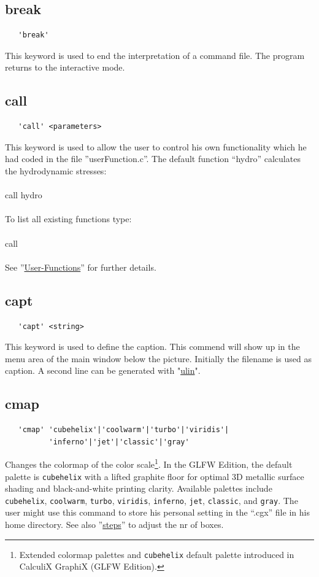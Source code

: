 \documentclass{article}
\providecommand{\htmlref}[2]{\hyperref[#2]{#1}}
\begin{document}
\subsection{\label{break}break}
\begin{verbatim}
   'break'
\end{verbatim}
This keyword is used to end the interpretation of a command file. The program returns to the interactive mode.

\subsection{\label{call}call}
\begin{verbatim}
   'call' <parameters>
\end{verbatim}
This keyword is used to allow the user to control his own functionality which he had coded in the file ''userFunction.c''. The default function ``hydro'' calculates the hydrodynamic stresses:\\\\call hydro\\\\To list all existing functions type:\\\\call\\\\See ''\htmlref{User-Functions}{User-Functions}'' for further details. 

\subsection{\label{capt}capt}
\begin{verbatim}
   'capt' <string> 
\end{verbatim}
This keyword is used to define the caption. This commend will show up in the
menu area of the main window below the picture. Initially the filename is used
as caption. A second line can be generated with "\htmlref{ulin}{ulin}".

\subsection{\label{cmap}cmap}
\begin{verbatim}
   'cmap' 'cubehelix'|'coolwarm'|'turbo'|'viridis'|
          'inferno'|'jet'|'classic'|'gray'
\end{verbatim}
Changes the colormap of the color scale\footnote{Extended colormap palettes and \texttt{cubehelix} default palette introduced in CalculiX GraphiX (GLFW Edition).}. In the GLFW Edition, the default palette is \texttt{cubehelix} with a lifted graphite floor for optimal 3D metallic surface shading and black-and-white printing clarity. Available palettes include \texttt{cubehelix}, \texttt{coolwarm}, \texttt{turbo}, \texttt{viridis}, \texttt{inferno}, \texttt{jet}, \texttt{classic}, and \texttt{gray}. The user might use this command to store his personal setting in the ``.cgx'' file in his home directory. See also ''\htmlref{steps}{steps}'' to adjust the nr of boxes.
\end{document}
